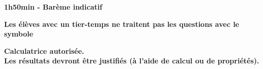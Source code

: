 \documentclass[11pt,a4paper]{article}  %
\begin{document}
	\graphicspath{{images/}}
	
	\begin{center}
		
		
	\end{center}

\begin{center}\textbf{1h50min - Barème indicatif}\end{center}
\begin{center}\textbf{Les élèves avec un tier-temps ne traitent pas les questions avec  le symbole }\end{center}
\begin{center}\textbf{Calculatrice autorisée.\\Les résultats devront être justifiés (à l'aide de calcul ou de propriétés).}\end{center}


\end{document}
